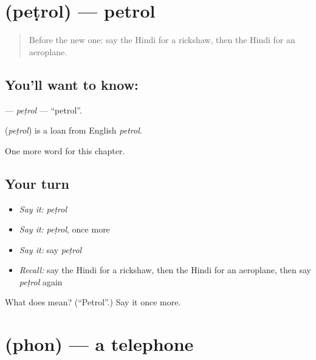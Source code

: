 \section[\texorpdfstring{\hi{पेट्रोल} (peṭrol)}{पेट्रोल (peṭrol)}]{ (peṭrol) — petrol}

\label{lesson:HI-C204-petrol}



\begin{quote}
Before the new one: say the Hindi for a rickshaw, then the Hindi for an aeroplane.
\end{quote}

\subsection*{You'll want to know: }
\textbf{} — \emph{peṭrol} — \textquotedblleft{}petrol\textquotedblright{}.

\begin{cousinweb}
\textbf{} (\emph{peṭrol}) is a loan from English \emph{petrol}.
\end{cousinweb}

\begin{grammarlens}[title={What you've built}]
One more word for this chapter.
\end{grammarlens}

\subsection*{Your turn}
\begin{itemize}
\raggedright
  \item \emph{Say it:} \emph{peṭrol}
  \item \emph{Say it:} \emph{peṭrol}, once more
  \item \emph{Say it:} say \emph{peṭrol}
  \item \emph{Recall:} say the Hindi for a rickshaw, then the Hindi for an aeroplane, then say \emph{peṭrol} again
\end{itemize}

\begin{tcolorbox}[breakable,colback=teal!4,colframe=teal!35!black,title={Before you move on}]
What does  mean? (\textquotedblleft{}Petrol\textquotedblright{}.) Say it once more.
\end{tcolorbox}
\section[\texorpdfstring{\hi{फ़ोन} (phon)}{फ़ोन (phon)}]{ (phon) — a telephone}

